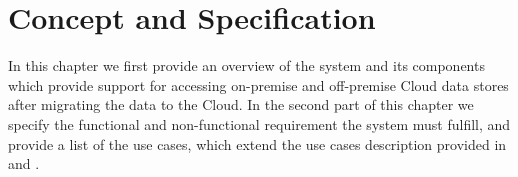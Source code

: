 \chapter{Concept and Specification}
\label{chap:spec}

In this chapter we first provide an overview of the system and its components which provide support for accessing on-premise and off-premise Cloud data stores after migrating the data to the Cloud. In the second part of this chapter we specify the functional and non-functional requirement the system must fulfill, and provide a list of the use cases, which extend the use cases description provided in \cite{Uralov2012} and \cite{Muhler2012}.









